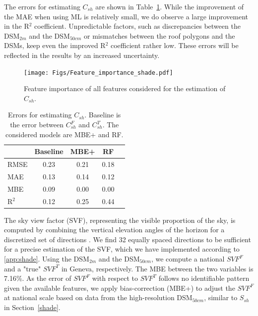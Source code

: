 The errors for estimating $C_{sh}$ are shown in Table~\ref{tab:errors_Csh}. While the improvement of the MAE when using ML is relatively small, we do observe a large improvement in the R$^2$ coefficient.
Unpredictable factors, such as discrepancies between the DSM$_{2m}$ and the DSM$_{50cm}$ or mismatches between the roof polygons and the DSMs, keep even the improved R$^2$ coefficient rather low. 
These errors will be reflected in the results by an increased uncertainty.

\begin{figure}[tb]
\centering
\texttt{[image: Figs/Feature\_importance\_shade.pdf]}  
\caption{Feature importance of all features considered for the estimation of $C_{sh}$.}
\label{fig:RF_Csh}
\end{figure}

\begin{table}[tb]
\centering
\footnotesize
\begin{tabular}{lcccc}
\hline
      & \textbf{Baseline} & \textbf{MBE+} & \textbf{RF}   \\ \hline
RMSE  & 0.23     & 0.21  & 0.18 \\
MAE   & 0.13     & 0.14  & 0.12 \\
MBE   & 0.09     & 0.00  & 0.00 \\
R$^2$ & 0.12     & 0.25  & 0.44 \\ \hline
\end{tabular}
\caption{Errors for estimating $C_{sh}$. Baseline is the error between $C_{sh}^F$ and $C_{sh}^T$. The considered models are MBE+ and RF.}
\label{tab:errors_Csh}
\end{table}

The sky view factor (SVF), representing the visible proportion of the sky, is computed by combining the vertical elevation angles of the horizon for a discretized set of directions \cite{zaksek_sky-view_2011}. We find 32 equally spaced directions to be sufficient for a precise estimation of the SVF, which we have implemented according to \ref{app:shade}.
Using the DSM$_{2m}$ and the DSM$_{50cm}$, we compute a national $SVF^F$ and a "true" $SVF^T$ in Geneva, respectively. The MBE between the two variables is 7.16\%.  
As the error of $SVF^F$ with respect to $SVF^T$ follows no identifiable pattern given the available features, we apply bias-correction (MBE+) to adjust the $SVF^F$ at national scale based on data from the high-resolution DSM$_{50cm}$, similar to $S_{sh}$ in Section~\ref{shade}.


